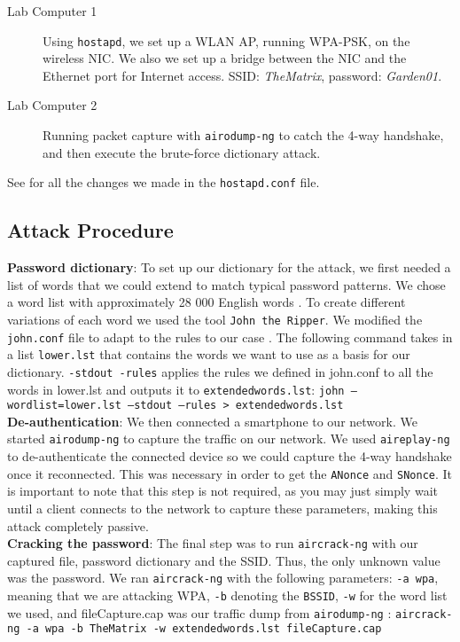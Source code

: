 \documentclass[a4paper,11pt]{article}
\begin{document}
\begin{description}
	\item[Lab Computer 1] Using \texttt{hostapd}, we set up a WLAN AP, running WPA-PSK, on the wireless NIC. We also we set up a bridge between the NIC and the Ethernet port for Internet access. SSID: \textit{TheMatrix}, password: \textit{Garden01}.
	\item[Lab Computer 2] Running packet capture with \texttt{airodump-ng} to catch the 4-way handshake, and then execute the brute-force dictionary attack.
\end{description}

\noindent See  for all the changes we made in the \texttt{hostapd.conf} file.

\subsection{Attack Procedure}

\textbf{Password dictionary}: To set up our dictionary for the attack, we first needed a list of words that we could extend to match typical password patterns. We chose a word list with approximately 28 000 English words \cite{wordlist}. To create different variations of each word we used the tool \texttt{John the Ripper}. We modified the \texttt{john.conf} file to adapt to the rules to our case \cite{johnrules}. The following command takes in a list \texttt{lower.lst} that contains the words we want to use as a basis for our dictionary. \texttt{-stdout -rules} applies the rules we defined in john.conf to all the words in lower.lst and outputs it to \texttt{extendedwords.lst}: \texttt{john --wordlist=lower.lst --stdout --rules > extendedwords.lst}\\

\noindent \textbf{De-authentication}: We then connected a smartphone to our network. We started \texttt{airodump-ng} to capture the traffic on our network.  We used \texttt{aireplay-ng} to de-authenticate the connected device so we could capture the 4-way handshake once it reconnected. This was necessary in order to get the \texttt{ANonce} and \texttt{SNonce}. It is important to note that this step is not required, as you may just simply wait until a client connects to the network to capture these parameters, making this attack completely passive. \\

\noindent \textbf{Cracking the password}: The final step was to run \texttt{aircrack-ng} with our captured file, password dictionary and the SSID. Thus, the only unknown value was the password. We ran \texttt{aircrack-ng} with the following parameters: \texttt{-a wpa}, meaning that we are attacking WPA, \texttt{-b} denoting the \texttt{BSSID}, \texttt{-w} for  the word list we used, and fileCapture.cap was our traffic dump from \texttt{airodump-ng} \cite{aircrack}: \texttt{aircrack-ng -a wpa -b TheMatrix
-w extendedwords.lst fileCapture.cap}
\end{document}
